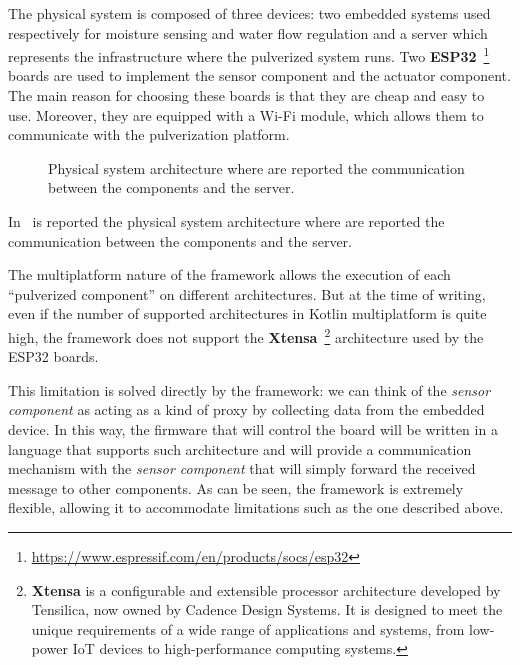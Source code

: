 The physical system is composed of three devices: two embedded systems used respectively for moisture sensing and water flow regulation and a server
which represents the infrastructure where the pulverized system runs.
Two \textbf{ESP32}~\footnote{\url{https://www.espressif.com/en/products/socs/esp32}} boards are used to implement the sensor component and the
actuator component. The main reason for choosing these boards is that they are cheap and easy to use. Moreover, they are equipped with a Wi-Fi
module, which allows them to communicate with the pulverization platform.

\begin{figure}
	\centering
	\caption{Physical system architecture where are reported the communication between the components and the server.}
	\label{fig:demo-1-physical-system}
\end{figure}

In~ is reported the physical system architecture where are reported the communication between the components and the
server.

The multiplatform nature of the framework allows the execution of each ``pulverized component'' on different architectures.
But at the time of writing, even if the number of supported architectures in Kotlin multiplatform is quite high, the framework does not support the
\textbf{Xtensa}~\footnote{\textbf{Xtensa} is a configurable and extensible processor architecture developed by Tensilica, now owned by Cadence Design
	Systems. It is designed to meet the unique requirements of a wide range of applications and systems, from low-power IoT devices to
	high-performance computing systems.}
architecture used by the ESP32 boards.

This limitation is solved directly by the framework: we can think of the \emph{sensor component} as acting as a kind of proxy by collecting data from
the embedded device. In this way, the firmware that will control the board will be written in a language that supports such architecture and will
provide a communication mechanism with the \emph{sensor component} that will simply forward the received message to other components.
As can be seen, the framework is extremely flexible, allowing it to accommodate limitations such as the one described above.


